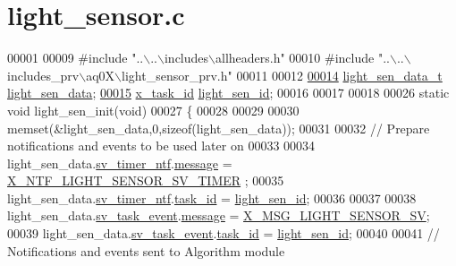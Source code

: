 \hypertarget{a00047_source}{\section{light\+\_\+sensor.\+c}
\label{a00047_source}
}

\begin{DoxyCode}
00001 
00009 \textcolor{preprocessor}{#include "..\(\backslash\)..\(\backslash\)includes\(\backslash\)allheaders.h"} 
00010 \textcolor{preprocessor}{#include "..\(\backslash\)..\(\backslash\)includes\_prv\(\backslash\)aq0X\(\backslash\)light\_sensor\_prv.h"}
00011 
00012 
\hypertarget{a00047_source_l00014}{}\hyperlink{a00047_a53c98c9f84d5cecf0747bbe1f6b83696}{00014} \hyperlink{a00024_d8/d2e/a00588}{light\_sen\_data\_t} \hyperlink{a00047_a53c98c9f84d5cecf0747bbe1f6b83696}{light\_sen\_data};
\hypertarget{a00047_source_l00015}{}\hyperlink{a00047_a757e7771170ace1d9f8519bd318ec64a}{00015} \hyperlink{a00036_ad5c3c5fbfd3e4aadf22830395484a71d}{x\_task\_id}        \hyperlink{a00047_a757e7771170ace1d9f8519bd318ec64a}{light\_sen\_id};
00016 
00017 
00018 
00026 \textcolor{keyword}{static} \textcolor{keywordtype}{void} light\_sen\_init(\textcolor{keywordtype}{void})
00027 \{
00028 
00029 
00030     memset(&light\_sen\_data,0,\textcolor{keyword}{sizeof}(light\_sen\_data));
00031 
00032     \textcolor{comment}{// Prepare notifications and events to be used later on}
00033 
00034     light\_sen\_data.\hyperlink{a00024_ada91b200053f2d93e3639dc4ee3415b4}{sv\_timer\_ntf}.\hyperlink{a00036_adf9665938515a20c283eea2c978cf80d}{message}                                  = 
      \hyperlink{a00024_ad7dfa3ed8d8d926ba462f9e951f1b391}{X\_NTF\_LIGHT\_SENSOR\_SV\_TIMER} ;
00035     light\_sen\_data.\hyperlink{a00024_ada91b200053f2d93e3639dc4ee3415b4}{sv\_timer\_ntf}.\hyperlink{a00036_a21b41e494a28583d4da10f1afb1c5328}{task\_id}                           = 
      \hyperlink{a00047_a757e7771170ace1d9f8519bd318ec64a}{light\_sen\_id};
00036 
00037 
00038     light\_sen\_data.\hyperlink{a00024_a43c345f39ea3aefbb60ef1ef57fe5d83}{sv\_task\_event}.\hyperlink{a00036_adf9665938515a20c283eea2c978cf80d}{message}                     = 
      \hyperlink{a00024_a5877f449ae4b7e77914fedf212c3d01f}{X\_MSG\_LIGHT\_SENSOR\_SV};
00039     light\_sen\_data.\hyperlink{a00024_a43c345f39ea3aefbb60ef1ef57fe5d83}{sv\_task\_event}.\hyperlink{a00036_a21b41e494a28583d4da10f1afb1c5328}{task\_id}                 = 
      \hyperlink{a00047_a757e7771170ace1d9f8519bd318ec64a}{light\_sen\_id};
00040 
00041     \textcolor{comment}{// Notifications and events sent to Algorithm module}

\end{DoxyCode}
